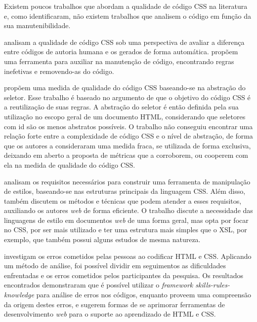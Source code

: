 Existem poucos trabalhos que abordam a qualidade de código CSS na literatura e, como  identificaram, não existem trabalhos que analisem o código em função da sua manutenibilidade.

 analisam a qualidade de código CSS sob uma perspectiva de avaliar a diferença entre códigos de autoria humana e os gerados de forma automática.  propõem uma ferramenta para auxiliar na manutenção de código, encontrando regras inefetivas e removendo-as do código.

 propõem uma medida de qualidade do código CSS baseando-se na abstração do seletor. Esse trabalho é baseado no argumento de que o objetivo do código CSS é a reutilização de suas regras. A abstração do seletor é então definida pela sua utilização no escopo geral de um documento HTML, considerando que seletores com id são os menos abstratos possíveis. O trabalho não conseguiu encontrar uma relação forte entre a complexidade de código CSS e o nível de abstração, de forma que os autores a consideraram uma medida fraca, se utilizada de forma exclusiva, deixando em aberto a proposta de métricas que a corroborem, ou cooperem com ela na medida de qualidade do código CSS.

 analisam os requisitos necessários para construir uma ferramenta de manipulação de estilos, baseando-se nas estruturas principais da linguagem CSS. Além disso, também discutem os métodos e técnicas que podem atender a esses requisitos, auxiliando os autores \textit{web} de forma eficiente. O trabalho discute a necessidade das linguagens de estilo em documentos \textit{web} de uma forma geral, mas opta por focar no CSS, por ser mais utilizado e ter uma estrutura mais simples que o XSL\footnotemark, por exemplo, que também possui alguns estudos de mesma natureza.


 investigam os erros cometidos pelas pessoas ao codificar HTML e CSS. Aplicando um método de análise, foi possível dividir em seguimentos as dificuldades enfrentadas e os erros cometidos pelos participantes da pesquisa. Os resultados encontrados demonstraram que é possível utilizar o \textit{framework skills-rules-knowledge} para análise de erros nos códigos, enquanto proveem uma compreensão da origem destes erros, e sugerem formas de se aprimorar ferramentas de desenvolvimento \textit{web} para o suporte ao aprendizado de HTML e CSS.

